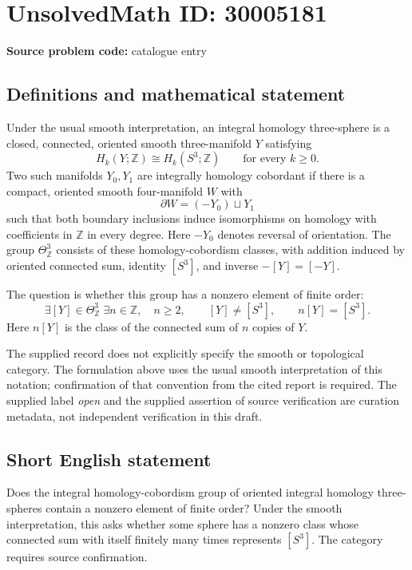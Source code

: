 \documentclass[11pt]{article}
\newcommand{\Z}{\mathbb{Z}}
\begin{document}
\section*{UnsolvedMath ID: 30005181}
\textbf{Source problem code:} catalogue entry
\subsection{Definitions and mathematical statement}
Under the usual smooth interpretation, an integral homology three-sphere is a closed, connected, oriented smooth three-manifold \(Y\) satisfying
\[
H_k(Y;\Z)\cong H_k(S^3;\Z)\qquad\text{for every }k\geq 0.
\]
Two such manifolds \(Y_0,Y_1\) are integrally homology cobordant if there is a compact, oriented smooth four-manifold \(W\) with
\[
\partial W=(-Y_0)\sqcup Y_1
\]
such that both boundary inclusions induce isomorphisms on homology with coefficients in \(\Z\) in every degree. Here \(-Y_0\) denotes reversal of orientation. The group \(\Theta^3_{\Z}\) consists of these homology-cobordism classes, with addition induced by oriented connected sum, identity \([S^3]\), and inverse \(-[Y]=[-Y]\).

The question is whether this group has a nonzero element of finite order:
\[
\exists [Y]\in\Theta^3_{\Z}\;\exists n\in\Z,\quad
n\geq 2,\qquad [Y]\neq [S^3],\qquad n[Y]=[S^3].
\]
Here \(n[Y]\) is the class of the connected sum of \(n\) copies of \(Y\).

The supplied record does not explicitly specify the smooth or topological category. The formulation above uses the usual smooth interpretation of this notation; confirmation of that convention from the cited report is required. The supplied label \emph{open} and the supplied assertion of source verification are curation metadata, not independent verification in this draft.
\subsection{Short English statement}
Does the integral homology-cobordism group of oriented integral homology three-spheres contain a nonzero element of finite order? Under the smooth interpretation, this asks whether some sphere has a nonzero class whose connected sum with itself finitely many times represents \([S^3]\). The category requires source confirmation.
\end{document}
